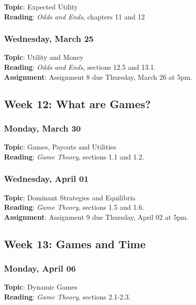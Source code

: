 \documentclass[
  letterpaper,
  DIV=11,
  numbers=noendperiod]{scrartcl}
\begin{document}
\textbf{Topic}: Expected Utility\\
\textbf{Reading}: \emph{Odds and Ends}, chapters 11 and 12

\subsubsection{Wednesday, March 25}\label{wednesday-march-25}

\textbf{Topic}: Utility and Money\\
\textbf{Reading}: \emph{Odds and Ends}, sections 12.5 and 13.1.\\
\textbf{Assignment}: Assignment 8 due Thursday, March 26 at 5pm.

\pagebreak

\subsection{Week 12: What are Games?}\label{week-12-what-are-games}

\subsubsection{Monday, March 30}\label{monday-march-30}

\textbf{Topic}: Games, Payouts and Utilities\\
\textbf{Reading}: \emph{Game Theory}, sections 1.1 and 1.2.

\subsubsection{Wednesday, April 01}\label{wednesday-april-01}

\textbf{Topic}: Dominant Strategies and Equilibria\\
\textbf{Reading}: \emph{Game Theory}, sections 1.5 and 1.6.\\
\textbf{Assignment}: Assignment 9 due Thursday, April 02 at 5pm.

\subsection{Week 13: Games and Time}\label{week-13-games-and-time}

\subsubsection{Monday, April 06}\label{monday-april-06}

\textbf{Topic}: Dynamic Games\\
\textbf{Reading}: \emph{Game Theory}, sections 2.1-2.3.
\end{document}
